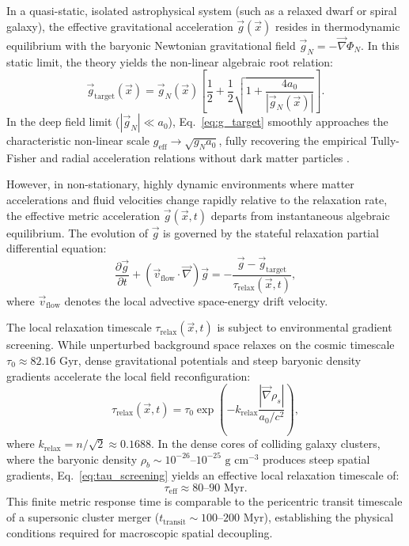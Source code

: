 \documentclass[aps,prd,reprint,superscriptaddress,nofootinbib,floatfix,amsmath,amssymb]{revtex4-2}
\begin{document}
In a quasi-static, isolated astrophysical system (such as a relaxed dwarf or spiral galaxy), the effective gravitational acceleration $\vec{g}(\vec{x})$ resides in thermodynamic equilibrium with the baryonic Newtonian gravitational field $\vec{g}_N = -\vec{\nabla}\Phi_N$. In this static limit, the theory yields the non-linear algebraic root relation:
\begin{equation}
\vec{g}_{\text{target}}(\vec{x}) = \vec{g}_N(\vec{x}) \left[ \frac{1}{2} + \frac{1}{2}\sqrt{1 + \frac{4 a_0}{|\vec{g}_N(\vec{x})|}} \right].
\label{eq:g_target}
\end{equation}
In the deep field limit ($|\vec{g}_N| \ll a_0$), Eq.~\eqref{eq:g_target} smoothly approaches the characteristic non-linear scale $g_{\text{eff}} \to \sqrt{g_N a_0}$, fully recovering the empirical Tully-Fisher and radial acceleration relations without dark matter particles \cite{Shreve2026_WideBinaries}.

However, in non-stationary, highly dynamic environments where matter accelerations and fluid velocities change rapidly relative to the relaxation rate, the effective metric acceleration $\vec{g}(\vec{x}, t)$ departs from instantaneous algebraic equilibrium. The evolution of $\vec{g}$ is governed by the stateful relaxation partial differential equation:
\begin{equation}
\frac{\partial \vec{g}}{\partial t} + (\vec{v}_{\text{flow}} \cdot \vec{\nabla})\vec{g} = -\frac{\vec{g} - \vec{g}_{\text{target}}}{\tau_{\text{relax}}(\vec{x}, t)},
\label{eq:relaxation_pde}
\end{equation}
where $\vec{v}_{\text{flow}}$ denotes the local advective space-energy drift velocity.

The local relaxation timescale $\tau_{\text{relax}}(\vec{x}, t)$ is subject to environmental gradient screening. While unperturbed background space relaxes on the cosmic timescale $\tau_0 \approx 82.16\text{ Gyr}$, dense gravitational potentials and steep baryonic density gradients accelerate the local field reconfiguration:
\begin{equation}
\tau_{\text{relax}}(\vec{x}, t) = \tau_0 \exp\left( -k_{\text{relax}} \frac{|\vec{\nabla}\rho_s|}{a_0 / c^2} \right),
\label{eq:tau_screening}
\end{equation}
where $k_{\text{relax}} = n / \sqrt{2} \approx 0.1688$. In the dense cores of colliding galaxy clusters, where the baryonic density $\rho_b \sim 10^{-26}\text{--}10^{-25}\text{ g cm}^{-3}$ produces steep spatial gradients, Eq.~\eqref{eq:tau_screening} yields an effective local relaxation timescale of:
\begin{equation}
\tau_{\text{eff}} \approx 80\text{--}90\text{ Myr}.
\label{eq:tau_eff}
\end{equation}
This finite metric response time is comparable to the pericentric transit timescale of a supersonic cluster merger ($t_{\text{transit}} \sim 100\text{--}200\text{ Myr}$), establishing the physical conditions required for macroscopic spatial decoupling.
\end{document}
